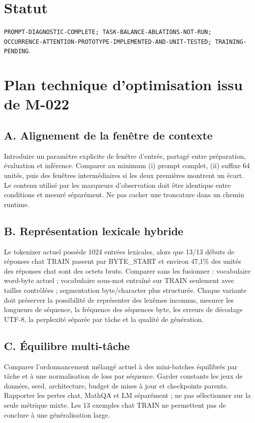 \documentclass[11pt,a4paper]{report}
\begin{document}
\section{Statut}
\begin{sloppypar}
\texttt{PROMPT-DIAGNOSTIC-COMPLETE; TASK-BALANCE-ABLATIONS-NOT-RUN; OCCURRENCE-ATTENTION-PROTOTYPE-IMPLEMENTED-AND-UNIT-TESTED; TRAINING-PENDING}.
\end{sloppypar}



\section*{Plan technique d'optimisation issu de M-022}
\subsection*{A. Alignement de la fenêtre de contexte}
Introduire un paramètre explicite de fenêtre d'entrée, partagé entre préparation, évaluation et inférence. Comparer au minimum (i) prompt complet, (ii) suffixe 64 unités, puis des fenêtres intermédiaires si les deux premières montrent un écart. Le contenu utilisé par les marqueurs d'observation doit être identique entre conditions et mesuré séparément. Ne pas cacher une troncature dans un chemin runtime.

\subsection*{B. Représentation lexicale hybride}
Le tokenizer actuel possède 1024 entrées lexicales, alors que 13/13 débuts de réponses chat TRAIN passent par BYTE\_START et environ 47,1\% des unités des réponses chat sont des octets bruts. Comparer sans les fusionner : vocabulaire word-byte actuel ; vocabulaire sous-mot entraîné sur TRAIN seulement avec tailles contrôlées ; segmentation byte/character plus structurée. Chaque variante doit préserver la possibilité de représenter des lexèmes inconnus, mesurer les longueurs de séquence, la fréquence des séquences byte, les erreurs de décodage UTF-8, la perplexité séparée par tâche et la qualité de génération.

\subsection*{C. Équilibre multi-tâche}
Comparer l'ordonnancement mélangé actuel à des mini-batches équilibrés par tâche et à une normalisation de loss par séquence. Garder constants les jeux de données, seed, architecture, budget de mises à jour et checkpoints parents. Rapporter les pertes chat, MathQA et LM séparément ; ne pas sélectionner sur la seule métrique mixte. Les 13 exemples chat TRAIN ne permettent pas de conclure à une généralisation large.
\end{document}

